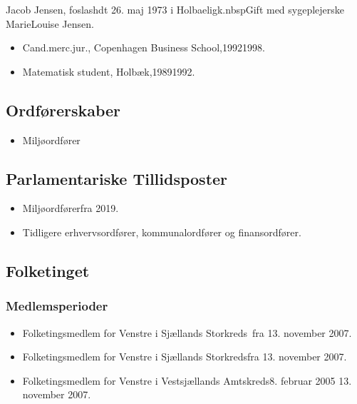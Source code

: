 \documentclass[11pt, a4paper]{awesome-cv}
\begin{document}
\makecvheader[R]
\makelettertitle
\begin{cvletter}
Jacob Jensen, foslashdt 26. maj 1973 i Holbaeligk.nbspGift med sygeplejerske MarieLouise Jensen.

\begin{itemize}
\item Cand.merc.jur., Copenhagen Business School,19921998.
\item Matematisk student, Holbæk,19891992.
\end{itemize}
\subsection*{Ordførerskaber}
\begin{itemize}
\item Miljøordfører
\end{itemize}
\subsection*{Parlamentariske Tillidsposter}
\begin{itemize}
\item Miljøordførerfra 2019.
\item Tidligere erhvervsordfører, kommunalordfører og finansordfører.
\end{itemize}
\subsection*{Folketinget}
\subsubsection*{Medlemsperioder}
\begin{itemize}
\item Folketingsmedlem for Venstre i Sjællands Storkreds fra 13. november 2007.
\item Folketingsmedlem for Venstre i Sjællands Storkredsfra 13. november 2007.
\item Folketingsmedlem for Venstre i Vestsjællands Amtskreds8. februar 2005  13. november 2007.
\end{itemize}

\end{cvletter}
\end{document}
